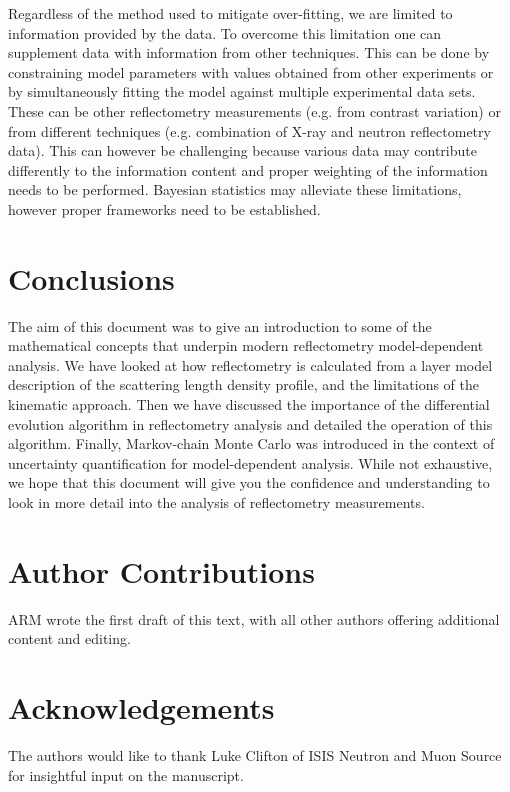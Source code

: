 \documentclass[
 reprint,
 superscriptaddress,
 amsmath,amssymb,
 aps,
]{revtex4-1}
\begin{document}
Regardless of the method used to mitigate over-fitting, we are limited to information provided by the data.
To overcome this limitation one can supplement data with information from other techniques.
This can be done by constraining model parameters with values obtained from other experiments or by simultaneously fitting the model against multiple experimental data sets.
These can be other reflectometry measurements (e.g. from contrast variation) or from different techniques (e.g. combination of X-ray and neutron reflectometry data).
This can however be challenging because various data may contribute differently to the information content and proper weighting of the information needs to be performed.
Bayesian statistics may alleviate these limitations, however proper frameworks need to be established.

\section{Conclusions}
The aim of this document was to give an introduction to some of the mathematical concepts that underpin modern reflectometry model-dependent analysis.
We have looked at how reflectometry is calculated from a layer model description of the scattering length density profile, and the limitations of the kinematic approach.
Then we have discussed the importance of the differential evolution algorithm in reflectometry analysis and detailed the operation of this algorithm.
Finally, Markov-chain Monte Carlo was introduced in the context of uncertainty quantification for model-dependent analysis.
While not exhaustive, we hope that this document will give you the confidence and understanding to look in more detail into the analysis of reflectometry measurements.

\section*{Author Contributions}
ARM wrote the first draft of this text, with all other authors offering additional content and editing.

\section*{Acknowledgements}
The authors would like to thank Luke Clifton of ISIS Neutron and Muon Source for insightful input on the manuscript.




\end{document}
